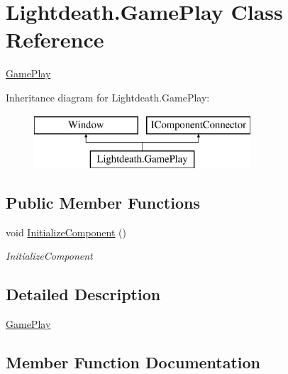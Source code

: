 \hypertarget{class_lightdeath_1_1_game_play}{}\section{Lightdeath.\+Game\+Play Class Reference}
\label{class_lightdeath_1_1_game_play}


\hyperlink{class_lightdeath_1_1_game_play}{Game\+Play}  


Inheritance diagram for Lightdeath.\+Game\+Play\+:\begin{figure}[H]
\begin{center}
\leavevmode
\includegraphics[height=2.000000cm]{class_lightdeath_1_1_game_play}
\end{center}
\end{figure}
\subsection*{Public Member Functions}
\begin{DoxyCompactItemize}
\item 
void \hyperlink{class_lightdeath_1_1_game_play_aa899770a3a3d3eb9d3472c8b76d5aeac}{Initialize\+Component} ()
\begin{DoxyCompactList}\small\item\em Initialize\+Component \end{DoxyCompactList}\end{DoxyCompactItemize}


\subsection{Detailed Description}
\hyperlink{class_lightdeath_1_1_game_play}{Game\+Play} 



\subsection{Member Function Documentation}
\hypertarget{class_lightdeath_1_1_game_play_aa899770a3a3d3eb9d3472c8b76d5aeac}{}\label{class_lightdeath_1_1_game_play_aa899770a3a3d3eb9d3472c8b76d5aeac} 
